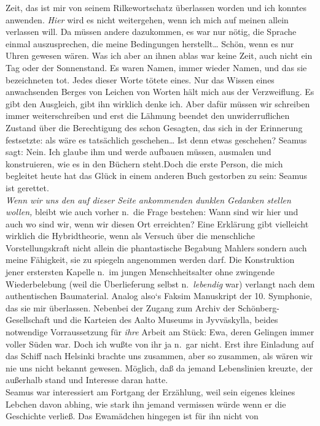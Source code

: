 \documentclass[
]{article}
\begin{document}
Zeit, das ist mir von seinem Rilkewortschatz überlassen worden und ich
konntes anwenden. \emph{Hier} wird es nicht weitergehen, wenn ich mich
auf meinen allein verlassen will. Da müssen andere dazukommen, es war
nur nötig, die Sprache einmal auszusprechen, die meine Bedingungen
herstellt\ldots{} Schön, wenn es nur Uhren gewesen wären. Was ich aber
an ihnen ablas war keine Zeit, auch nicht ein Tag oder der Sonnenstand.
Es waren Namen, immer wieder Namen, und das sie bezeichneten tot. Jedes
dieser Worte tötete eines. Nur das Wissen eines anwachsenden Berges von
Leichen von Worten hält mich aus der Verzweiflung. Es gibt den
Ausgleich, gibt ihn wirklich denke ich. Aber dafür müssen wir schreiben
immer weiterschreiben und erst die Lähmung beendet den unwiderruflichen
Zustand über die Berechtigung des schon Gesagten, das sich in der
Erinnerung festsetzte: als wäre es tatsächlich geschehen\ldots{} Ist
denn etwas geschehen? Seamus sagt: Nein. Ich glaube ihm und werde
aufbauen müssen, ausmalen und konstruieren, wie es in den Büchern
steht.Doch die erste Person, die mich begleitet heute hat das Glück in
einem anderen Buch gestorben zu sein: Seamus ist gerettet.\\
\emph{Wenn wir uns den auf dieser Seite ankommenden dunklen Gedanken
stellen wollen, }bleibt wie auch vorher n.~die Frage bestehen: Wann sind
wir hier und auch wo sind wir, wenn wir diesen Ort erreichten? Eine
Erklärung gibt vielleicht wirklich die Hybridtheorie, wenn als Versuch
über die menschliche Vorstellungskraft nicht allein die phantastische
Begabung Mahlers sondern auch meine Fähigkeit, sie zu spiegeln
angenommen werden darf. Die Konstruktion jener erstersten Kapelle n.~im
jungen Menschheitsalter ohne zwingende Wiederbelebung (weil die
Überlieferung selbst n.~\emph{lebendig} war) verlangt nach dem
authentischen Baumaterial. Analog also`s Faksim Manuskript der 10.
Symphonie, das sie mir überlassen. Nebenbei der Zugang zum Archiv der
Schönberg-Gesellschaft und die Karteien des Aalto Museums in
Jyvväskylla, beides notwendige Vorraussetzung für \emph{ihre} Arbeit am
Stück: Ewa, deren Gelingen immer voller Süden war. Doch ich wußte von
ihr ja n.~gar nicht. Erst ihre Einladung auf das Schiff nach Helsinki
brachte uns zusammen, aber so zusammen, als wären wir nie uns nicht
bekannt gewesen. Möglich, daß da jemand Lebenslinien kreuzte, der
außerhalb stand und Interesse daran hatte.\\
Seamus war interessiert am Fortgang der Erzählung, weil sein eigenes
kleines Lebchen davon abhing, wie stark ihn jemand vermissen würde wenn
er die Geschichte verließ. Das Ewamädchen hingegen ist für ihn nicht von
\end{document}

